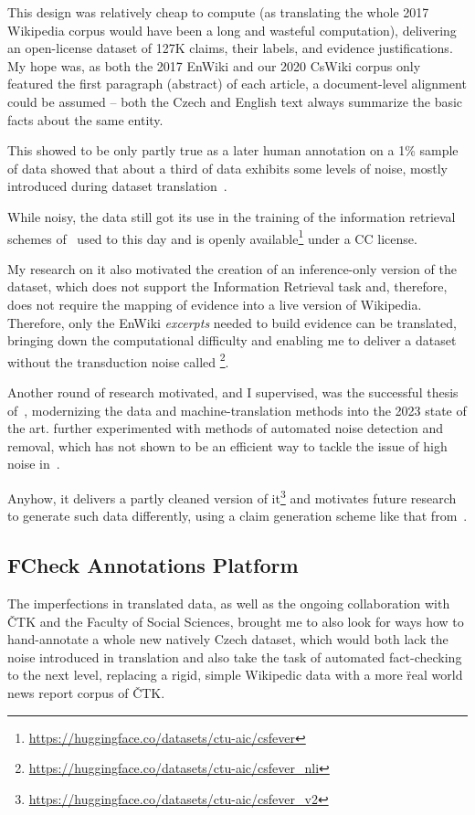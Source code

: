 This design was relatively cheap to compute (as translating the whole 2017 Wikipedia corpus would have been a long and wasteful computation), delivering an open-license dataset of 127K claims, their labels, and evidence justifications. My hope was, as both the 2017 EnWiki and our 2020 CsWiki corpus only featured the first paragraph (abstract) of each article, a document-level alignment could be assumed -- both the Czech and English text always summarize the basic facts about the same entity.

This showed to be only partly true as a later human annotation on a 1\% sample of \FCZ data showed that about a third of data exhibits some levels of noise, mostly introduced during dataset translation~\cite{lrev}.

While noisy, the \FCZ data still got its use in the training of the information retrieval schemes of~\cite{rypar, gazo, lrev} used to this day and is openly available\footnote{\url{https://huggingface.co/datasets/ctu-aic/csfever}} under a CC license.

My research on it also motivated the creation of an inference-only version of the dataset, which does not support the Information Retrieval task and, therefore, does not require the mapping of evidence into a live version of Wikipedia.
Therefore, only the EnWiki \textit{excerpts} needed to build evidence can be translated, bringing down the computational difficulty and enabling me to deliver a dataset without the transduction noise called \FCZNLI\footnote{\url{https://huggingface.co/datasets/ctu-aic/csfever_nli}}. 

Another round of research \FCZ motivated, and I supervised, was the successful thesis of~\cite{mlynar}, modernizing the data and machine-translation methods into the 2023 state of the art.
\cite{mlynar} further experimented with methods of automated noise detection and removal, which has not shown to be an efficient way to tackle the issue of high noise in \FCZ.

Anyhow, it delivers a partly cleaned version of it\footnote{\url{https://huggingface.co/datasets/ctu-aic/csfever_v2}} and motivates future research to generate such data differently, using a claim generation scheme like that from~\cite{pan2021zeroshot}.


\subsection{FCheck Annotations Platform}
The imperfections in translated \FCZ data, as well as the ongoing collaboration with ČTK and the Faculty of Social Sciences, brought me to also look for ways how to hand-annotate a whole new natively Czech dataset, which would both lack the noise introduced in translation and also take the task of automated fact-checking to the next level, replacing a rigid, simple Wikipedic data with a more \"{real world} news report corpus of ČTK.

